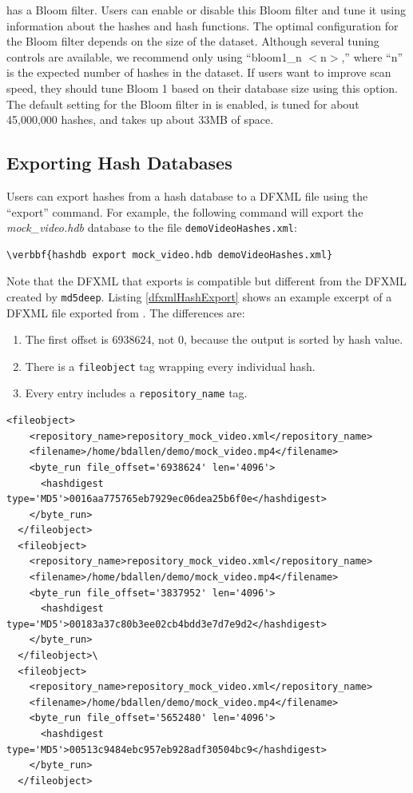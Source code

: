 \documentclass[11pt,fleqn]{article} %
\begin{document}
\hash has a Bloom filter.  Users can enable or disable this Bloom filter and tune it using information about the hashes and hash functions. The optimal configuration for the Bloom filter depends on the size of the dataset. Although several tuning controls are available, we recommend only using ``bloom1\_n $<$n$>$,'' where ``n'' is the expected number of hashes in the dataset. If users want to improve scan speed, they should tune Bloom 1 based on their database size using this option. The default setting for the Bloom filter in \hash is enabled, is tuned for about 45,000,000 hashes, and takes up about 33MB of space. 

\subsection{Exporting Hash Databases}
Users can export hashes from a hash database to a DFXML file using the ``export'' command. For example, the following command will export the \textit{mock\_video.hdb} database to the file \texttt{demoVideoHashes.xml}:
\begin{Verbatim}[commandchars=\\\{\}]
\verbbf{hashdb export mock_video.hdb demoVideoHashes.xml}
\end{Verbatim}

Note that the DFXML that \hash exports is compatible but different from the DFXML created by \texttt{md5deep}. Listing \ref{dfxmlHashExport} shows an example excerpt of a DFXML file exported from \hash. The differences are:
\begin{enumerate}
\item The first offset is 6938624, not 0,
because the output is sorted by hash value. 
\item There is a \texttt{fileobject} tag wrapping every individual hash.
\item Every entry includes a \texttt{repository\_name} tag.
\end{enumerate}

\lstset{style=customfile}
\begin{lstlisting}[float, caption=Excerpt of a DFXML exported by \hash, label=dfxmlHashExport]
  <fileobject>
    <repository_name>repository_mock_video.xml</repository_name>
    <filename>/home/bdallen/demo/mock_video.mp4</filename>
    <byte_run file_offset='6938624' len='4096'>
      <hashdigest type='MD5'>0016aa775765eb7929ec06dea25b6f0e</hashdigest>
    </byte_run>
  </fileobject>
  <fileobject>
    <repository_name>repository_mock_video.xml</repository_name>
    <filename>/home/bdallen/demo/mock_video.mp4</filename>
    <byte_run file_offset='3837952' len='4096'>
      <hashdigest type='MD5'>00183a37c80b3ee02cb4bdd3e7d7e9d2</hashdigest>
    </byte_run>
  </fileobject>\
  <fileobject>
    <repository_name>repository_mock_video.xml</repository_name>
    <filename>/home/bdallen/demo/mock_video.mp4</filename>
    <byte_run file_offset='5652480' len='4096'>
      <hashdigest type='MD5'>00513c9484ebc957eb928adf30504bc9</hashdigest>
    </byte_run>
  </fileobject>
\end{lstlisting}
\end{document}
